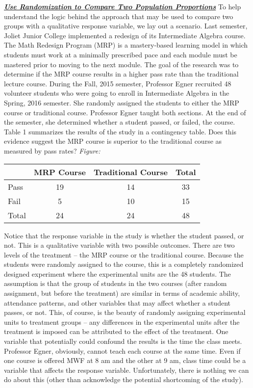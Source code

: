 \documentclass{report}
\begin{document}
    \bigbreak \noindent \bigbreak \noindent 
    \textbf{\textit{\underline{Use Randomization to Compare Two Population Proportions}}}
    \bigbreak \noindent 
    To help understand the logic behind the approach that may be used to compare two groups with a qualitative response variable, we lay out a scenario. Last semester, Joliet Junior College implemented a redesign of its Intermediate Algebra course. The Math Redesign Program (MRP) is a mastery-based learning model in which students must work at a minimally prescribed pace and each module must be mastered prior to moving to the next module. The goal of the research was to determine if the MRP course results in a higher pass rate than the traditional lecture course. During the Fall, 2015 semester, Professor Egner recruited 48 volunteer students who were going to enroll in Intermediate Algebra in the Spring, 2016 semester. She randomly assigned the students to either the MRP course or traditional course. Professor Egner taught both sections. At the end of the semester, she determined whether a student passed, or failed, the course. Table 1 summarizes the results of the study in a contingency table. Does this evidence suggest the MRP course is superior to the traditional course as measured by pass rates? 
    \bigbreak \noindent 
    \textit{Figure:}
    \begin{table}[h]
    \centering
    \begin{tabular}{|l|c|c|c|}
    \hline
    & MRP Course & Traditional Course & Total \\
    \hline
    Pass & 19 & 14 & 33 \\
    Fail & 5 & 10 & 15 \\
    \hline
    Total & 24 & 24 & 48 \\
    \hline
    \end{tabular}
    \end{table}
    \bigbreak \noindent 
    Notice that the response variable in the study is whether the student passed, or not. This is a qualitative variable with two possible outcomes. There are two levels of the treatment – the MRP course or the traditional course. Because the students were randomly assigned to the course, this is a completely randomized designed experiment where the experimental units are the 48 students. The assumption is that the group of students in the two courses (after random assignment, but before the treatment) are similar in terms of academic ability, attendance patterns, and other variables that may affect whether a student passes, or not. This, of course, is the beauty of randomly assigning experimental units to treatment groups – any differences in the experimental units after the treatment is imposed can be attributed to the effect of the treatment. One variable that potentially could confound the results is the time the class meets. Professor Egner, obviously, cannot teach each course at the same time. Even if one course is offered MWF at 8 am and the other at 9 am, class time could be a variable that affects the response variable. Unfortunately, there is nothing we can do about this (other than acknowledge the potential shortcoming of the study).
\end{document}
